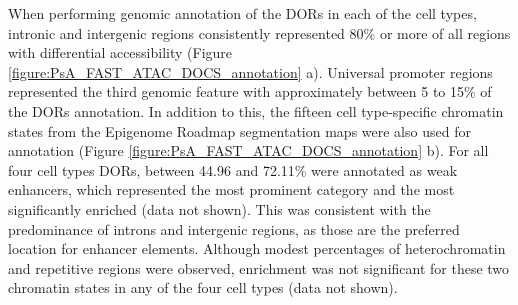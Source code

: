 When performing genomic annotation of the DORs in each of the cell types, intronic and intergenic regions consistently represented 80\% or more of all regions with differential accessibility (Figure \ref{figure:PsA_FAST_ATAC_DOCS_annotation} a). Universal promoter regions represented the third genomic feature with approximately between 5 to 15\% of the DORs annotation. In addition to this, the fifteen cell type-specific chromatin states from the Epigenome Roadmap segmentation maps were also used for annotation (Figure \ref{figure:PsA_FAST_ATAC_DOCS_annotation} b). For all four cell types DORs, between 44.96 and 72.11\% were annotated as weak enhancers, which represented the most prominent category and the most significantly enriched (data not shown). This was consistent with the predominance of introns and intergenic regions, as those are the preferred location for enhancer elements. Although modest percentages of heterochromatin and repetitive regions were observed, enrichment was not significant for these two chromatin states in any of the four cell types (data not shown).

